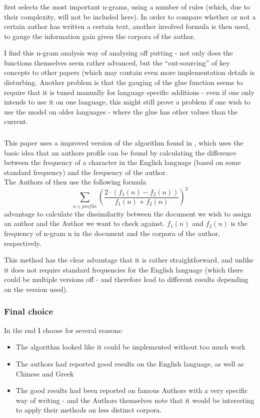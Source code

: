 \subsubsection{\cite{nr3}}
\cite{nr3} first selects the most important n-grams, using a number of rules (which, due to their complexity, will not be included here). In order to compare whether or not a certain author has written a certain text, another involved formula is then used, to gauge the information gain given the corpora of the author.

I find this n-gram analysis way of analysing off putting - not only does the functions themselves seem rather advanced, but the ``out-sourcing'' of key concepts to other papers (which may contain even more implementation details is disturbing. Another problem is that the gauging of the glue function seems to require that it is tuned manually for language specific additions - even if one only intends to use it on one language, this might still prove a problem if one wish to use the model on older languages - where the glue has other values than the current. 

\subsubsection{\cite{nr2}}
This paper uses a improved version of the algorithm found in \cite{Bennet}, which uses the basic idea that an authors profile can be found by calculating the difference between the frequency of a character in the English language (based on some standard frequency) and the frequency of the author.\\

The Authors of \cite{nr2} then use the following formula
$$
\sum_{n \in profile}\left(\frac{2 \cdot (f_1(n) - f_2(n))}{f_1(n) + f_2(n)}\right)^2
$$advantage
to calculate the dissimilarity between the document we wish to assign an author and the Author we want to check against. $f_1(n)$ and $f_2(n)$ is the frequency of n-gram n in the document and the corpora of the author, respectively. 

This method has the clear advantage that it is rather straightforward, and unlike \cite{Bennet} it does not require standard frequencies for the English language (which there could be multiple versions off - and therefore lead to different results depending on the version used).

\subsubsection{Final choice}

In the end I choose \cite{nr4} for several reasons:
\begin{itemize}
\item The algorithm looked like it could be implemented without too much work
\item The authors had reported good results on the English language, as well as Chinese and Greek
\item The good results had been reported on famous Authors with a very specific way of writing - and the Authors themselves note that it would be interesting to apply their methods on less distinct corpora. 
\end{itemize}
